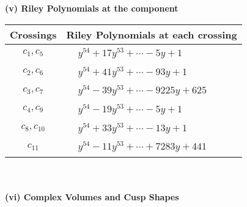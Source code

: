 \documentclass[1p]{elsarticle_modified}
\theoremstyle{definition}
\begin{document}
\newpage\renewcommand{\arraystretch}{1}
\flushleft \textbf{(v) Riley Polynomials at the component}\newline \\
\begin{tabular}{m{50pt}|m{274pt}}
Crossings & \hspace{64pt}Riley Polynomials at each crossing \\
\hline $$\begin{aligned}c_{1},c_{5}\end{aligned}$$&$\begin{aligned}
&y^{54}+17 y^{53}+\cdots-5 y+1
\end{aligned}$\\
\hline $$\begin{aligned}c_{2},c_{6}\end{aligned}$$&$\begin{aligned}
&y^{54}+41 y^{53}+\cdots-93 y+1
\end{aligned}$\\
\hline $$\begin{aligned}c_{3},c_{7}\end{aligned}$$&$\begin{aligned}
&y^{54}-39 y^{53}+\cdots-9225 y+625
\end{aligned}$\\
\hline $$\begin{aligned}c_{4},c_{9}\end{aligned}$$&$\begin{aligned}
&y^{54}-19 y^{53}+\cdots-5 y+1
\end{aligned}$\\
\hline $$\begin{aligned}c_{8},c_{10}\end{aligned}$$&$\begin{aligned}
&y^{54}+33 y^{53}+\cdots-13 y+1
\end{aligned}$\\
\hline $$\begin{aligned}c_{11}\end{aligned}$$&$\begin{aligned}
&y^{54}-11 y^{53}+\cdots+7283 y+441
\end{aligned}$\\
\hline
\end{tabular}\\~\\
\newpage\flushleft \textbf{(vi) Complex Volumes and Cusp Shapes}
\end{document}

